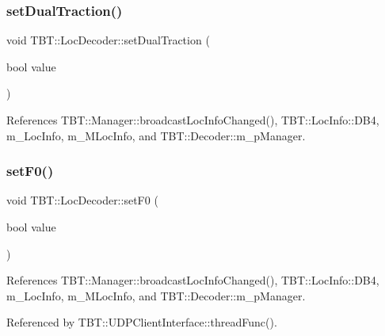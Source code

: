 \subsubsection{\texorpdfstring{set\+Dual\+Traction()}{setDualTraction()}}
{\footnotesize\ttfamily void T\+B\+T\+::\+Loc\+Decoder\+::set\+Dual\+Traction (\begin{DoxyParamCaption}\item[{bool}]{value }\end{DoxyParamCaption})\hspace{0.3cm}{\ttfamily [inline]}}



References T\+B\+T\+::\+Manager\+::broadcast\+Loc\+Info\+Changed(), T\+B\+T\+::\+Loc\+Info\+::\+D\+B4, m\+\_\+\+Loc\+Info, m\+\_\+\+M\+Loc\+Info, and T\+B\+T\+::\+Decoder\+::m\+\_\+p\+Manager.

\mbox{\label{classTBT_1_1LocDecoder_ae7dc2a2221ba08ecaf34f50636f59b54_ae7dc2a2221ba08ecaf34f50636f59b54}} 
\subsubsection{\texorpdfstring{set\+F0()}{setF0()}}
{\footnotesize\ttfamily void T\+B\+T\+::\+Loc\+Decoder\+::set\+F0 (\begin{DoxyParamCaption}\item[{bool}]{value }\end{DoxyParamCaption})\hspace{0.3cm}{\ttfamily [inline]}}



References T\+B\+T\+::\+Manager\+::broadcast\+Loc\+Info\+Changed(), T\+B\+T\+::\+Loc\+Info\+::\+D\+B4, m\+\_\+\+Loc\+Info, m\+\_\+\+M\+Loc\+Info, and T\+B\+T\+::\+Decoder\+::m\+\_\+p\+Manager.



Referenced by T\+B\+T\+::\+U\+D\+P\+Client\+Interface\+::thread\+Func().

\mbox{\label{classTBT_1_1LocDecoder_aba76c6a9b002224297ba04ded570eee4_aba76c6a9b002224297ba04ded570eee4}} 
